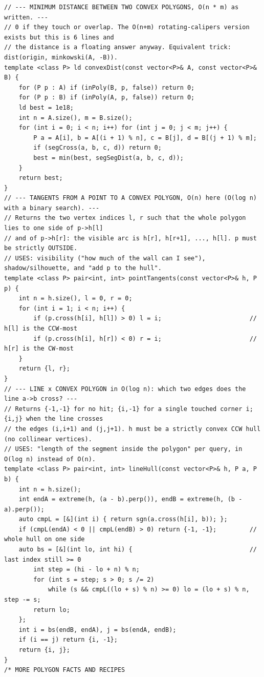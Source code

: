 \documentclass[9pt,a4paper,twocolumn]{extarticle}
\begin{document}
\begin{lstlisting}
// --- MINIMUM DISTANCE BETWEEN TWO CONVEX POLYGONS, O(n * m) as written. ---
// 0 if they touch or overlap. The O(n+m) rotating-calipers version exists but this is 6 lines and
// the distance is a floating answer anyway. Equivalent trick: dist(origin, minkowski(A, -B)).
template <class P> ld convexDist(const vector<P>& A, const vector<P>& B) {
    for (P p : A) if (inPoly(B, p, false)) return 0;
    for (P p : B) if (inPoly(A, p, false)) return 0;
    ld best = 1e18;
    int n = A.size(), m = B.size();
    for (int i = 0; i < n; i++) for (int j = 0; j < m; j++) {
        P a = A[i], b = A[(i + 1) % n], c = B[j], d = B[(j + 1) % m];
        if (segCross(a, b, c, d)) return 0;
        best = min(best, segSegDist(a, b, c, d));
    }
    return best;
}
// --- TANGENTS FROM A POINT TO A CONVEX POLYGON, O(n) here (O(log n) with a binary search). ---
// Returns the two vertex indices l, r such that the whole polygon lies to one side of p->h[l]
// and of p->h[r]: the visible arc is h[r], h[r+1], ..., h[l]. p must be strictly OUTSIDE.
// USES: visibility ("how much of the wall can I see"), shadow/silhouette, and "add p to the hull".
template <class P> pair<int, int> pointTangents(const vector<P>& h, P p) {
    int n = h.size(), l = 0, r = 0;
    for (int i = 1; i < n; i++) {
        if (p.cross(h[i], h[l]) > 0) l = i;                        // h[l] is the CCW-most
        if (p.cross(h[i], h[r]) < 0) r = i;                        // h[r] is the CW-most
    }
    return {l, r};
}
// --- LINE x CONVEX POLYGON in O(log n): which two edges does the line a->b cross? ---
// Returns {-1,-1} for no hit; {i,-1} for a single touched corner i; {i,j} when the line crosses
// the edges (i,i+1) and (j,j+1). h must be a strictly convex CCW hull (no collinear vertices).
// USES: "length of the segment inside the polygon" per query, in O(log n) instead of O(n).
template <class P> pair<int, int> lineHull(const vector<P>& h, P a, P b) {
    int n = h.size();
    int endA = extreme(h, (a - b).perp()), endB = extreme(h, (b - a).perp());
    auto cmpL = [&](int i) { return sgn(a.cross(h[i], b)); };
    if (cmpL(endA) < 0 || cmpL(endB) > 0) return {-1, -1};         // whole hull on one side
    auto bs = [&](int lo, int hi) {                                // last index still >= 0
        int step = (hi - lo + n) % n;
        for (int s = step; s > 0; s /= 2)
            while (s && cmpL((lo + s) % n) >= 0) lo = (lo + s) % n, step -= s;
        return lo;
    };
    int i = bs(endB, endA), j = bs(endA, endB);
    if (i == j) return {i, -1};
    return {i, j};
}
/* MORE POLYGON FACTS AND RECIPES

\end{lstlisting}
\end{document}
